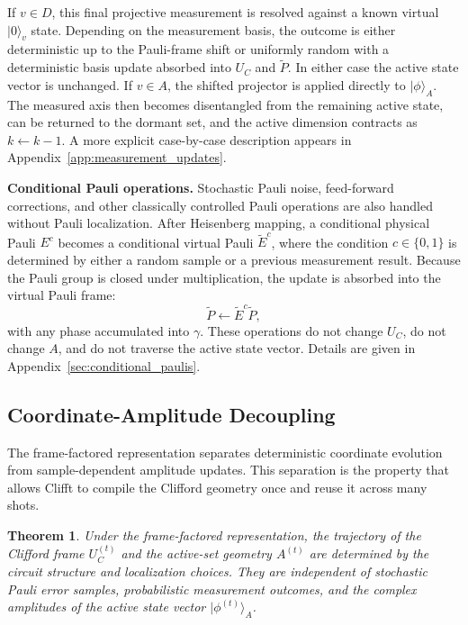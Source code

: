 \documentclass[a4paper, onecolumn, unpublished]{quantumarticle}
\newtheorem{theorem}{Theorem}
\begin{document}
    If $v \in D$, this final projective measurement is resolved against a known virtual $|0\rangle_v$ state. Depending on the measurement basis, the outcome is either deterministic up to the Pauli-frame shift or uniformly random with a deterministic basis update absorbed into $U_C$ and $\tilde{P}$. In either case the active state vector is unchanged. If $v \in A$, the shifted projector is applied directly to $|\phi\rangle_A$. The measured axis then becomes disentangled from the remaining active state, can be returned to the dormant set, and the active dimension contracts as $k \leftarrow k-1$. A more explicit case-by-case description appears in Appendix~\ref{app:measurement_updates}.

    \textbf{Conditional Pauli operations.}
    Stochastic Pauli noise, feed-forward corrections, and other classically controlled Pauli operations are also handled without Pauli localization. After Heisenberg mapping, a conditional physical Pauli $E^c$ becomes a conditional virtual Pauli $\tilde{E}^c$, where the condition $c \in \{0,1\}$ is determined by either a random sample or a previous measurement result. Because the Pauli group is closed under multiplication, the update is absorbed into the virtual Pauli frame:
    \begin{equation}
        \tilde{P} \leftarrow \tilde{E}^c \tilde{P},
    \end{equation}
    with any phase accumulated into $\gamma$. These operations do not change $U_C$, do not change $A$, and do not traverse the active state vector. Details are given in Appendix~\ref{sec:conditional_paulis}.

    \subsection{Coordinate-Amplitude Decoupling}
    \label{sec:decoupling_theorem}

    The frame-factored representation separates deterministic coordinate evolution from sample-dependent amplitude updates. This separation is the property that allows Clifft to compile the Clifford geometry once and reuse it across many shots.

    \begin{theorem}
    \label{thm:decoupling}
    Under the frame-factored representation, the trajectory of the Clifford frame $U_C^{(t)}$ and the active-set geometry $A^{(t)}$ are determined by the circuit structure and localization choices. They are independent of stochastic Pauli error samples, probabilistic measurement outcomes, and the complex amplitudes of the active state vector $|\phi^{(t)}\rangle_A$.
    \end{theorem}
\end{document}
